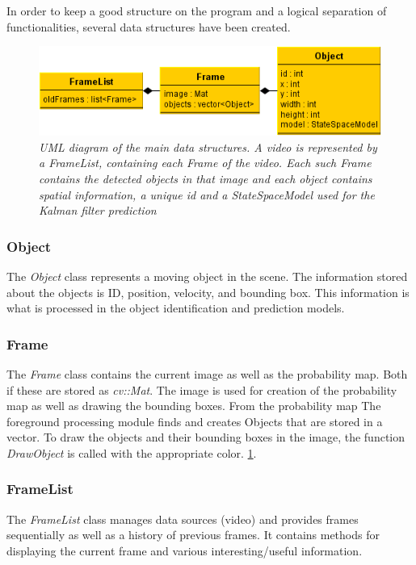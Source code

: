 In order to keep a good structure on the program and a logical separation of functionalities, several data structures have been created.

\begin{figure}[htb]
	\centering
	\includegraphics[width=150mm]{images/data_structures_uml.png}
	\caption{\textit{UML diagram of the main data structures. A video is represented by a FrameList, containing each Frame of the video. Each such Frame contains the detected objects in that image and each object contains spatial information, a unique id and a StateSpaceModel used for the Kalman filter prediction}}
	\label{fig:UML_fig} %
\end{figure}


\subsubsection{Object}
The \emph{Object} class represents a moving object in the scene. The information stored about the objects is ID, position, velocity, and bounding box. This information is what is processed in the object identification and prediction models. 

\subsubsection{Frame}
The \emph{Frame} class contains the current image as well as the probability map. Both if these are stored as \emph{cv::Mat}. The image is used for creation of the probability map as well as drawing the bounding boxes. From the probability map The foreground processing module finds and creates Objects that are stored in a vector. To draw the objects and their bounding boxes in the image, the function \emph{DrawObject} is called with the appropriate color. \ref{fig:UML_fig}. %

\subsubsection{FrameList}
The \emph{FrameList} class manages data sources (video) and provides frames sequentially as well as a history of previous frames. It contains methods for displaying the current frame and various interesting/useful information.




